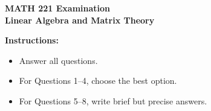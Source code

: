 \documentclass[11pt]{article}
\begin{document}
\begin{center}
  {\Large \textbf{MATH 221 Examination}}\\[0.25em]
  {\large \textbf{Linear Algebra and Matrix Theory}}\\[0.5em]
\end{center}

\noindent\textbf{Instructions:}
\begin{itemize}
  \item Answer all questions.
  \item For Questions 1--4, choose the best option.
  \item For Questions 5--8, write brief but precise answers.
\end{itemize}

\vspace{0.5em}
\end{document}
